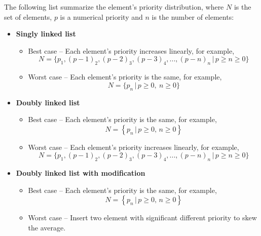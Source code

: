 \documentclass[a4paper,11pt]{kth-mag}
\newcommand*{\skippara}{\par\vspace{\baselineskip} \noindent}
\begin{document}
\skippara The following list summarize the element's priority distribution, where $N$ is the set of elements, $p$ is a numerical priority and $n$ is the number of elements:
\clearpage
\begin{itemize}
    \item \textbf{Singly linked list}
        \begin{itemize}
            \item Best case -- Each element's priority increases linearly, for example,
                \begin{equation*}
                    N = \Big\{p_1, (p-1)_2, (p-2)_3, (p-3)_4,...,(p-n)_n \, \Big| \, p \ge n \ge 0 \Big\}
                \end{equation*}
            \item Worst case -- Each element's priority is the same, for example,
                \begin{equation*}
                    N = \Big\{p_{n} \, \Big| \, p \ge 0,\ n \ge 0 \Big\}
                \end{equation*}
        \end{itemize}
    \item \textbf{Doubly linked list}
        \begin{itemize}
            \item Best case -- Each element's priority is the same, for example,
                \begin{equation*}
                    N = \left\{p_{n} \, \Big| \, p \ge 0,\, n \ge 0 \right\}
                \end{equation*}
            \item Worst case -- Each element's priority increases linearly, for example,
                \begin{equation*}
                    N = \Big\{p_1, (p-1)_2, (p-2)_3, (p-3)_4,...,(p-n)_n \, \Big| \, p \ge n\ge 0 \Big\}
                \end{equation*}
        \end{itemize}
    \item \textbf{Doubly linked list with modification}
        \begin{itemize}
            \item Best case -- Each element's priority is the same, for example,
                \begin{equation*}
                    N = \left\{p_{n} \, \Big| \, p \ge 0,\, n \ge 0 \right\}
                \end{equation*}
            \item Worst case -- Insert two element with significant different priority to skew the average.

\end{itemize}
\end{itemize}
\end{document}
